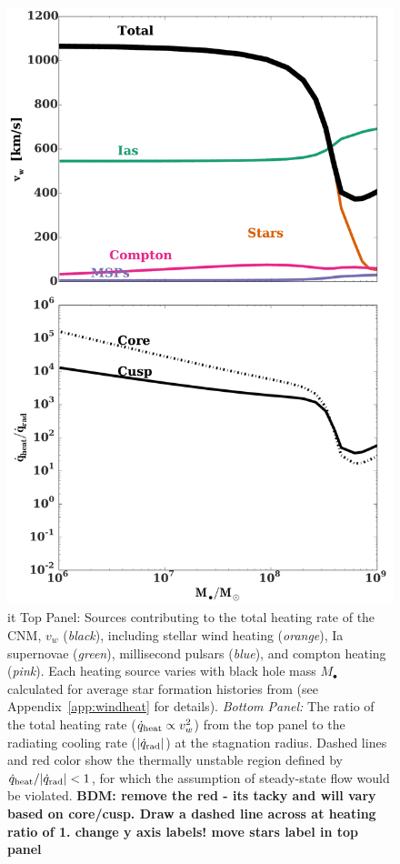 \documentclass[usenatbib,fleqn]{mn2e}
\newcommand{\Mbh}[1][]{M_{\bullet#1}}
\newcommand{\vwO}{v_{w}}
\begin{document}
\begin{figure}
\includegraphics[width=\columnwidth]{vwSources.pdf}
\caption{\label{fig:vwSources} {it Top Panel:} Sources contributing to the total heating rate of the CNM, $\vwO$ ({\it black}), including stellar wind heating ({\it orange}), Ia supernovae ({\it green}), millisecond pulsars ({\it blue}), and compton heating ({\it pink}).  Each heating source varies with black hole mass $\Mbh$ calculated for average star formation histories from
  \citet{MosterNaab+:2013a} (see Appendix~\ref{app:windheat} for details).  {\it Bottom Panel:} The
  ratio of the total heating rate ($\dot{q}_{\rm heat} \propto v_{w}^{2}$) from the top panel to the radiating cooling rate
  ($|\dot{q}_{\rm rad}|$) at the stagnation radius.  Dashed lines and red color show the thermally unstable region defined by $\dot{q}_{\rm heat}/|\dot{q}_{\rm rad}| < 1$, for which the assumption of steady-state flow would be violated.  {\bf BDM: remove the red - its tacky and will vary based on core/cusp.  Draw a dashed line across at heating ratio of 1.  change y axis labels!  move stars label in top panel}}
\end{figure}
\end{document}
